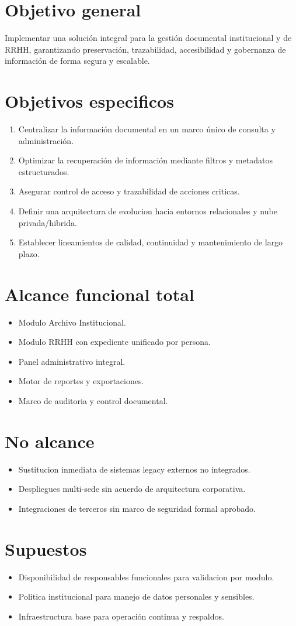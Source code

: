 \section{Objetivo general}
Implementar una solución integral para la gestión documental institucional y de RRHH, garantizando preservación, trazabilidad, accesibilidad y gobernanza de información de forma segura y escalable.

\section{Objetivos especificos}
\begin{enumerate}
  \item Centralizar la información documental en un marco único de consulta y administración.
  \item Optimizar la recuperación de información mediante filtros y metadatos estructurados.
  \item Asegurar control de acceso y trazabilidad de acciones criticas.
  \item Definir una arquitectura de evolucion hacia entornos relacionales y nube privada/hibrida.
  \item Establecer lineamientos de calidad, continuidad y mantenimiento de largo plazo.
\end{enumerate}

\section{Alcance funcional total}
\begin{itemize}
  \item Modulo Archivo Institucional.
  \item Modulo RRHH con expediente unificado por persona.
  \item Panel administrativo integral.
  \item Motor de reportes y exportaciones.
  \item Marco de auditoria y control documental.
\end{itemize}

\section{No alcance}
\begin{itemize}
  \item Sustitucion inmediata de sistemas legacy externos no integrados.
  \item Despliegues multi-sede sin acuerdo de arquitectura corporativa.
  \item Integraciones de terceros sin marco de seguridad formal aprobado.
\end{itemize}

\section{Supuestos}
\begin{itemize}
  \item Disponibilidad de responsables funcionales para validacion por modulo.
  \item Politica institucional para manejo de datos personales y sensibles.
  \item Infraestructura base para operación continua y respaldos.
\end{itemize}
